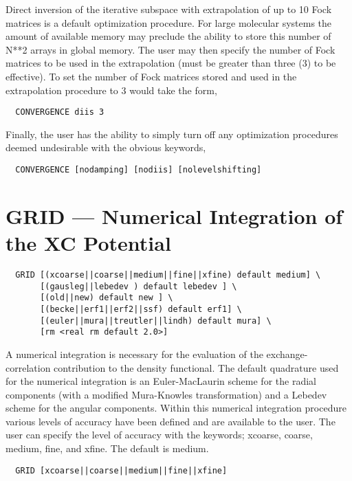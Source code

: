 Direct inversion of the iterative subspace with extrapolation of up to
10 Fock matrices is a default optimization procedure.  For large
molecular systems the amount of available memory may preclude the ability to
store this number of N**2 arrays in global memory.  The user may then
specify the number of Fock matrices to be used in the extrapolation
(must be greater than three (3) to be effective).  To set the number of
Fock matrices stored and used in the extrapolation procedure to 3
would take the form,
\begin{verbatim}
  CONVERGENCE diis 3
\end{verbatim}

Finally, the user has the ability to simply turn off any optimization
procedures deemed undesirable with the obvious keywords,
\begin{verbatim}
  CONVERGENCE [nodamping] [nodiis] [nolevelshifting]
\end{verbatim}


\section{GRID --- Numerical Integration of the XC Potential}
\label{grgrid}
\begin{verbatim}
  GRID [(xcoarse||coarse||medium||fine||xfine) default medium] \
       [(gausleg||lebedev ) default lebedev ] \
       [(old||new) default new ] \
       [(becke||erf1||erf2||ssf) default erf1] \
       [(euler||mura||treutler||lindh) default mura] \
       [rm <real rm default 2.0>]
\end{verbatim}

A numerical integration is necessary for the evaluation of the
exchange-correlation contribution to the density functional.  The
default quadrature used for the numerical integration is an
Euler-MacLaurin scheme for the radial components (with a modified
Mura-Knowles transformation)
and a Lebedev
scheme for the angular components.  Within this numerical
integration procedure various levels of accuracy have been defined and
are available to the user.  The user can specify the level of accuracy
with the keywords; xcoarse, coarse, medium, fine, and xfine.  The
default is medium.

\begin{verbatim}
  GRID [xcoarse||coarse||medium||fine||xfine]
\end{verbatim}

